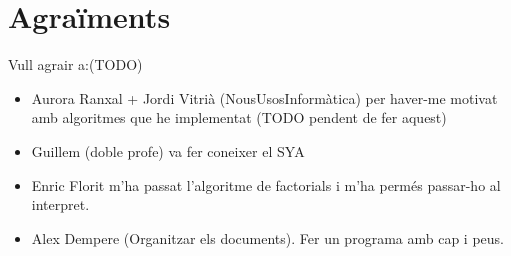 \section*{Agraïments}
Vull agrair a:(TODO)
\begin{itemize}
    \item Aurora Ranxal + Jordi Vitrià (NousUsosInformàtica) per haver-me motivat amb algoritmes que he implementat (TODO pendent de fer aquest)
    \item Guillem (doble profe) va fer coneixer el SYA
    \item Enric Florit m'ha passat l'algoritme de factorials i m'ha permés passar-ho al interpret.
    \item Alex Dempere (Organitzar els documents). Fer un programa amb cap i peus.
\end{itemize}